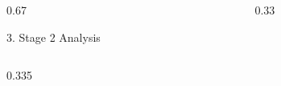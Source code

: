 \documentclass[final]{beamer}
\newlength{\twocolwid}
\begin{document}
\begin{frame}[t]
\begin{columns}[t]
\begin{column}{\twocolwid}
\begin{columns}[t,totalwidth=\twocolwid]
\begin{column}{0.67\twocolwid}
\begin{block}{3. Stage 2 Analysis}
\begin{columns}[t,totalwidth=0.67\twocolwid]
\begin{column}{0.335\twocolwid}
%
%
%
%



\end{column}

\end{columns}


\end{block}


\end{column}



\begin{column}{0.33\twocolwid}








\end{column}
\end{columns}
\end{column}
\end{columns}
\end{frame}
\end{document}
